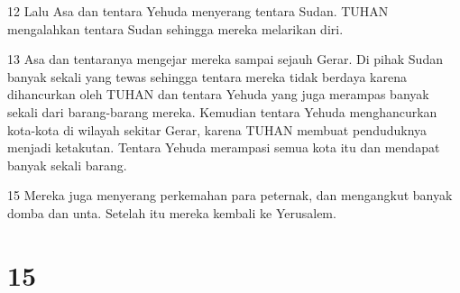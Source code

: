 \par 12 Lalu Asa dan tentara Yehuda menyerang tentara Sudan. TUHAN mengalahkan tentara Sudan sehingga mereka melarikan diri.
\par 13 Asa dan tentaranya mengejar mereka sampai sejauh Gerar. Di pihak Sudan banyak sekali yang tewas sehingga tentara mereka tidak berdaya karena dihancurkan oleh TUHAN dan tentara Yehuda yang juga merampas banyak sekali dari barang-barang mereka. Kemudian tentara Yehuda menghancurkan kota-kota di wilayah sekitar Gerar, karena TUHAN membuat penduduknya menjadi ketakutan. Tentara Yehuda merampasi semua kota itu dan mendapat banyak sekali barang.
\par 15 Mereka juga menyerang perkemahan para peternak, dan mengangkut banyak domba dan unta. Setelah itu mereka kembali ke Yerusalem.

\chapter{15}

